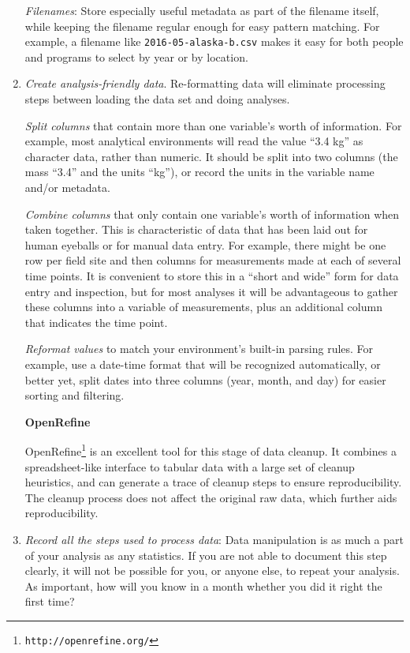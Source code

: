\documentclass[10pt]{article}
\newcommand{\recommend}[1]{\textit{#1}}
\newcommand{\withurl}[2]{{#1}\footnote{\texttt{#2}}}
\begin{document}
\begin{enumerate}
  \emph{Filenames}: Store
  especially useful metadata as part of the filename itself, while
  keeping the filename regular enough for easy pattern matching. For
  example, a filename like \texttt{2016-05-alaska-b.csv} makes it easy
  for both people and programs to select by year or by location. 
  
\item
  \recommend{Create analysis-friendly data}. Re-formatting data will   
  eliminate processing steps between loading the
  data set and doing analyses.
  
  \emph{Split columns} that contain more 
  than one variable's worth of information. For example, most analytical environments will read the value ``3.4 kg'' 
  as character data, rather than numeric. It should be split into two columns (the mass ``3.4'' and
  the units ``kg''), or record the units in the variable
  name and/or metadata.

  \emph{Combine columns} that only contain one variable's worth of
  information when taken together. This is
  characteristic of data that has been laid out for human eyeballs or
  for manual data entry.  For example, there might be one row per
  field site and then columns for measurements made at each of several
  time points. It is convenient to store this in a ``short and wide''
  form for data entry and inspection, but for most analyses it will be
  advantageous to gather these columns into a variable of
  measurements, plus an additional column that indicates the
  time point.

  \emph{Reformat values} to match your environment's built-in
  parsing rules. For example, use a date-time format that will be
  recognized automatically, or better yet, split dates into three
  columns (year, month, and day) for easier sorting and filtering.

  \begin{framed}
    \noindent \textbf{OpenRefine}

    \withurl{OpenRefine}{http://openrefine.org/}
    is an excellent tool
    for this stage of data cleanup. It combines a spreadsheet-like
    interface to tabular data with a large set of cleanup heuristics,
    and can generate a trace of cleanup steps to ensure
    reproducibility.  The cleanup process does not affect the original
    raw data, which further aids reproducibility.
  \end{framed}

\item
  \recommend{Record all the steps used to process data}: Data manipulation is as
  much a part of your analysis as any statistics. If you are not able to 
  document this step clearly, it will not be possible for you, or anyone 
  else, to repeat your analysis. As important, how will you know in 
  a month whether you did it
  right the first time?
  

\end{enumerate}
\end{document}
